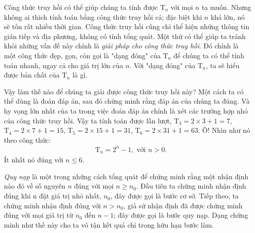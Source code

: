 Công thức truy hồi có thể giúp chúng ta tính được $\mathrm{T}_n$ với mọi $n$ ta muốn. Nhưng không ai thich tính toán bằng công thức truy hồi cả;  đặc biệt khi $n$ khá lớn, nó sẽ tốn rất nhiều thời gian. Công thức truy hồi cũng chỉ thể hiện những thông tin gián tiếp và địa phương, không có tính tổng quát. Một thứ có thể giúp ta tránh khỏi những vấn đề này chính là \textit{giải pháp cho công thức truy hồi}. Đó chính là một công thức đẹp, gọn, còn gọi là "dạng đóng" của $\mathrm{T}_n$ để chúng ta có thể tính toán nhanh, ngay cả cho giá trị lớn của $n$. Với "dạng đóng" của $\mathrm{T}_n$, ta sẽ hiểu được bản chất của $\mathrm{T}_n$ là gì.

Vậy làm thế nào để chúng ta giải được công thức truy hồi này? Một cách ta có thể dùng là đoán đáp án, sau đó chứng minh rằng đáp án của chúng ta đúng. Và hy vọng lớn nhất của ta trong việc đoán đáp án chính là xét các trường hợp nhỏ của công thức truy hồi. Vậy ta tính toán được lần lượt, $\mathrm{T}_3 = 2 \times 3 + 1 = 7$, $\mathrm{T}_4 = 2 \times 7 + 1 = 15$, $\mathrm{T}_5 = 2 \times 15 + 1 = 31$, $\mathrm{T}_6 = 2 \times 31 + 1 = 63$. Ô! Nhìn như nó theo công thức:
\begin{equation}\label{eq:1.2}
    \begin{aligned}
        & \mathrm{T}_n = 2^n - 1, \text{ \ \ \ \ với } n > 0.
    \end{aligned}
\end{equation}
Ít nhất nó đúng với $n \le 6$.


\textit{Quy nạp} 
là một trong những cách tổng quát để chứng minh rằng một nhận định nào đó về số nguyên $n$ đúng với mọi $n \ge n_0$. Đầu tiên ta chứng minh nhận định đúng khi n đặt giá trị nhỏ nhất, $n_0$, đây được gọi là bước cơ sở. Tiếp theo, ta chứng minh nhận định đúng với $n > n_0$, giả sử nhận định đã được chứng minh đúng với mọi giá trị từ $n_0$ đến $n - 1$; đây được gọi là bước quy nạp. Dạng chứng minh như thế này cho ta vô tận kết quả chỉ trong hữu hạn bước làm.



